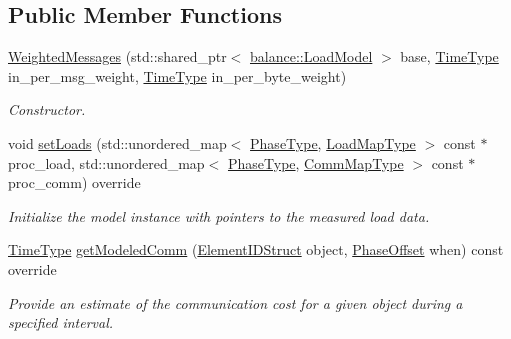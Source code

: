 \subsection*{Public Member Functions}
\begin{DoxyCompactItemize}
\item 
\hyperlink{structvt_1_1vrt_1_1collection_1_1balance_1_1_weighted_messages_ac5151d922cbb092e9bea5ccdbf4ff980}{Weighted\+Messages} (std\+::shared\+\_\+ptr$<$ \hyperlink{structvt_1_1vrt_1_1collection_1_1balance_1_1_load_model}{balance\+::\+Load\+Model} $>$ base, \hyperlink{namespacevt_a876a9d0cd5a952859c72de8a46881442}{Time\+Type} in\+\_\+per\+\_\+msg\+\_\+weight, \hyperlink{namespacevt_a876a9d0cd5a952859c72de8a46881442}{Time\+Type} in\+\_\+per\+\_\+byte\+\_\+weight)
\begin{DoxyCompactList}\small\item\em Constructor. \end{DoxyCompactList}\item 
void \hyperlink{structvt_1_1vrt_1_1collection_1_1balance_1_1_weighted_messages_ad0e6b88668ac59f4fb376a2dba81e593}{set\+Loads} (std\+::unordered\+\_\+map$<$ \hyperlink{namespacevt_a46ce6733d5cdbd735d561b7b4029f6d7}{Phase\+Type}, \hyperlink{namespacevt_1_1vrt_1_1collection_1_1balance_a5339303db2e1ce964d783a53fd74e6b1}{Load\+Map\+Type} $>$ const $\ast$proc\+\_\+load, std\+::unordered\+\_\+map$<$ \hyperlink{namespacevt_a46ce6733d5cdbd735d561b7b4029f6d7}{Phase\+Type}, \hyperlink{namespacevt_1_1vrt_1_1collection_1_1balance_a01ee1fb0ae2da1d2ab7fdca3be9ae351}{Comm\+Map\+Type} $>$ const $\ast$proc\+\_\+comm) override
\begin{DoxyCompactList}\small\item\em Initialize the model instance with pointers to the measured load data. \end{DoxyCompactList}\item 
\hyperlink{namespacevt_a876a9d0cd5a952859c72de8a46881442}{Time\+Type} \hyperlink{structvt_1_1vrt_1_1collection_1_1balance_1_1_weighted_messages_aa392b1af7d42136794129ac167b2dbd8}{get\+Modeled\+Comm} (\hyperlink{namespacevt_1_1vrt_1_1collection_1_1balance_a9f5b53fafb270212279a4757d2c4cd28}{Element\+I\+D\+Struct} object, \hyperlink{structvt_1_1vrt_1_1collection_1_1balance_1_1_phase_offset}{Phase\+Offset} when) const override
\begin{DoxyCompactList}\small\item\em Provide an estimate of the communication cost for a given object during a specified interval. \end{DoxyCompactList}\end{DoxyCompactItemize}
